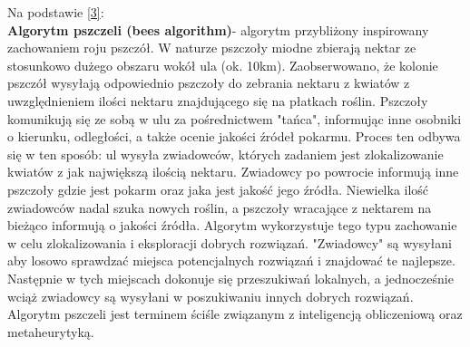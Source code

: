 \documentclass[a4paper, twoside, 12pt, justified]{article}
\begin{document}
	Na podstawie \hyperlink{bees}{[3]}:\\
	\textbf{Algorytm pszczeli (bees algorithm)}- algorytm przybliżony inspirowany zachowaniem roju pszczół. W naturze pszczoły miodne zbierają nektar ze stosunkowo dużego obszaru wokół ula (ok. 10km). Zaobserwowano, że kolonie pszczół wysyłają odpowiednio pszczoły do zebrania nektaru z kwiatów z uwzględnieniem ilości nektaru znajdującego się na płatkach roślin. Pszczoły komunikują się ze sobą w ulu za pośrednictwem "tańca", informując inne osobniki o kierunku, odległości, a także ocenie jakości źródeł pokarmu. Proces ten odbywa się w ten sposób: ul wysyła zwiadowców, których zadaniem jest zlokalizowanie kwiatów z jak największą ilością nektaru. Zwiadowcy po powrocie informują inne pszczoły gdzie jest pokarm oraz jaka jest jakość jego źródła. Niewielka ilość zwiadowców nadal szuka nowych roślin, a pszczoły wracające z nektarem na bieżąco informują o jakości źródła. Algorytm wykorzystuje tego typu zachowanie w celu zlokalizowania i eksploracji dobrych rozwiązań. "Zwiadowcy" są wysyłani aby losowo sprawdzać miejsca potencjalnych rozwiązań i znajdować te najlepsze. Następnie w tych miejscach dokonuje się przeszukiwań lokalnych, a jednocześnie wciąż zwiadowcy są wysyłani w poszukiwaniu innych dobrych rozwiązań.    
	Algorytm pszczeli jest terminem ściśle związanym z inteligencją obliczeniową oraz metaheurytyką.\\
	
\end{document}
